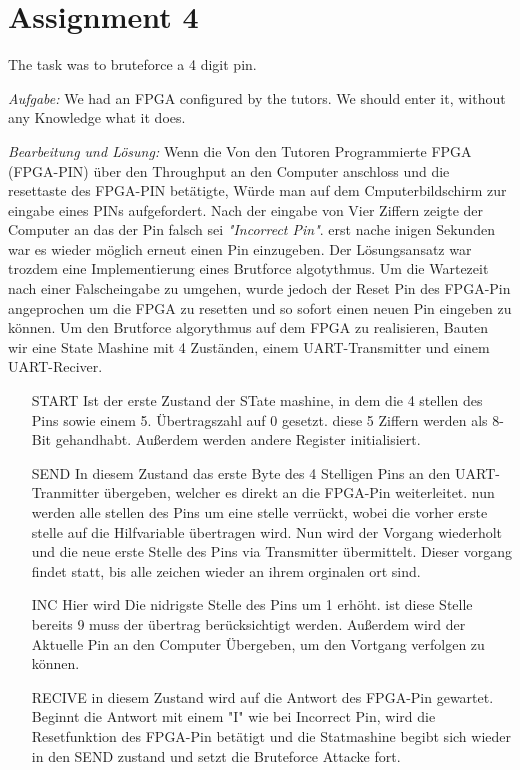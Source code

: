 \section*{Assignment 4}
The task was to bruteforce a 4 digit pin.

\emph{Aufgabe: }We had an FPGA configured by the tutors. We should enter it, without any Knowledge what it does.

\emph{Bearbeitung und Lösung: }Wenn die Von den Tutoren Programmierte FPGA (FPGA-PIN) über den Throughput an den Computer anschloss und die resettaste des FPGA-PIN betätigte, Würde man auf dem Cmputerbildschirm zur eingabe eines PINs aufgefordert. Nach der eingabe von Vier Ziffern zeigte der Computer an das der Pin falsch sei \emph{"Incorrect Pin"}. erst nache inigen Sekunden war es wieder möglich erneut einen Pin einzugeben. 
Der Lösungsansatz war trozdem eine Implementierung eines Brutforce algotythmus. Um die Wartezeit nach einer Falscheingabe zu umgehen, wurde jedoch der Reset Pin des FPGA-Pin angeprochen um die FPGA zu resetten und so sofort einen neuen Pin eingeben zu können. 
Um den Brutforce algorythmus auf dem FPGA zu realisieren, Bauten wir eine State Mashine mit 4 Zuständen, einem UART-Transmitter und einem UART-Reciver.

\begin{itemize}


\item[START] Ist der erste Zustand der STate mashine, in dem die 4 stellen des Pins sowie einem 5. Übertragszahl auf 0 gesetzt. diese 5 Ziffern werden als 8-Bit gehandhabt. Außerdem werden andere Register initialisiert.

\item[SEND] In diesem Zustand das erste Byte des 4 Stelligen Pins an den UART-Tranmitter übergeben, welcher es direkt an die FPGA-Pin weiterleitet. nun werden alle stellen des Pins um eine stelle verrückt, wobei die vorher erste stelle auf die Hilfvariable übertragen wird. Nun wird der Vorgang wiederholt und die neue erste Stelle des Pins via Transmitter übermittelt. Dieser vorgang findet statt, bis alle zeichen wieder an ihrem orginalen ort sind. 

\item[INC] Hier wird Die nidrigste Stelle des Pins um 1 erhöht. ist diese Stelle bereits 9 muss der übertrag berücksichtigt werden. Außerdem wird der Aktuelle Pin an den Computer Übergeben, um den Vortgang verfolgen zu können.

\item[RECIVE] in diesem Zustand wird auf die Antwort des FPGA-Pin gewartet. Beginnt die Antwort mit einem "I" wie bei Incorrect Pin, wird die Resetfunktion des FPGA-Pin betätigt und die Statmashine begibt sich wieder in den SEND zustand und setzt die Bruteforce Attacke fort.

\end{itemize}


